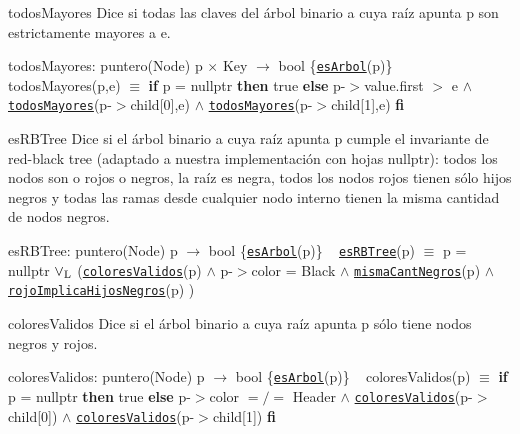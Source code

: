 \begin{DoxyParagraph}{todos\+Mayores}
Dice si todas las claves del árbol binario a cuya raíz apunta p son estrictamente mayores a e.

todos\+Mayores\+: puntero(\+Node) p $\times$ Key $\to$ bool \{\href{axiomas.html#esArbol}{\tt es\+Arbol}(p)\} ~\newline
todos\+Mayores(p,e) $\equiv$ {\bfseries if} p = nullptr {\bfseries then} true {\bfseries else} p-\/$>$value.\+first $>$ e $\land$ \href{axiomas.html#todosMayores}{\tt todos\+Mayores}(p-\/$>$child\mbox{[}0\mbox{]},e) $\land$ \href{axiomas.html#todosMayores}{\tt todos\+Mayores}(p-\/$>$child\mbox{[}1\mbox{]},e) {\bfseries fi} 


\end{DoxyParagraph}
\begin{DoxyParagraph}{es\+R\+B\+Tree}
Dice si el árbol binario a cuya raíz apunta p cumple el invariante de red-\/black tree (adaptado a nuestra implementación con hojas nullptr)\+: todos los nodos son o rojos o negros, la raíz es negra, todos los nodos rojos tienen sólo hijos negros y todas las ramas desde cualquier nodo interno tienen la misma cantidad de nodos negros.

es\+R\+B\+Tree\+: puntero(\+Node) p $\to$ bool \{\href{axiomas.html#esArbol}{\tt es\+Arbol}(p)\} ~\newline
\href{axiomas.html#esRBTree}{\tt es\+R\+B\+Tree}(p) $\equiv$ p = nullptr $\lor_{\rm L}$ (\href{axiomas.html#coloresValidos}{\tt colores\+Validos}(p) $\land$ p-\/$>$color = Black $\land$ \href{axiomas.html#mismaCantNegros}{\tt misma\+Cant\+Negros}(p) $\land$ \href{axiomas.html#rojoImplicaHijosNegros}{\tt rojo\+Implica\+Hijos\+Negros}(p) )


\end{DoxyParagraph}
\begin{DoxyParagraph}{colores\+Validos}
Dice si el árbol binario a cuya raíz apunta p sólo tiene nodos negros y rojos.

colores\+Validos\+: puntero(\+Node) p $\to$ bool \{\href{axiomas.html#esArbol}{\tt es\+Arbol}(p)\} ~\newline
colores\+Validos(p) $\equiv$ {\bfseries if} p = nullptr {\bfseries then} true {\bfseries else} p-\/$>$color $=/=$ Header $\land$ \href{axiomas.html#coloresValidos}{\tt colores\+Validos}(p-\/$>$child\mbox{[}0\mbox{]}) $\land$ \href{axiomas.html#coloresValidos}{\tt colores\+Validos}(p-\/$>$child\mbox{[}1\mbox{]}) {\bfseries fi} 


\end{DoxyParagraph}
